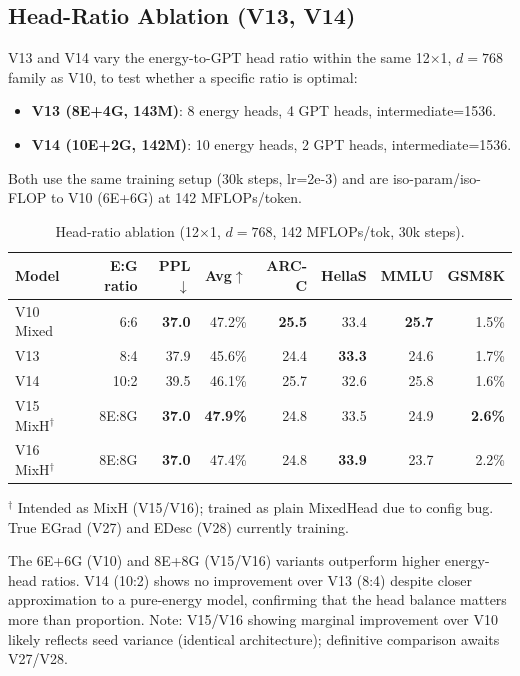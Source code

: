 \documentclass[11pt,a4paper]{article}
\begin{document}
\subsection{Head-Ratio Ablation (V13, V14)}

V13 and V14 vary the energy-to-GPT head ratio within the same 12$\times$1,
$d{=}768$ family as V10, to test whether a specific ratio is optimal:

\begin{itemize}
  \item \textbf{V13 (8E+4G, 143M)}: 8 energy heads, 4 GPT heads, intermediate=1536.
  \item \textbf{V14 (10E+2G, 142M)}: 10 energy heads, 2 GPT heads, intermediate=1536.
\end{itemize}

Both use the same training setup (30k steps, lr=2e-3) and are iso-param/iso-FLOP
to V10 (6E+6G) at 142 MFLOPs/token.

\begin{table}[h]
\centering
\caption{Head-ratio ablation (12$\times$1, $d{=}768$, 142 MFLOPs/tok, 30k steps).}
\label{tab:head_ratio}
\begin{tabular}{lrrrrrrr}
\toprule
\textbf{Model} & \textbf{E:G ratio} & \textbf{PPL}$\downarrow$ & \textbf{Avg}$\uparrow$
  & \textbf{ARC-C} & \textbf{HellaS} & \textbf{MMLU} & \textbf{GSM8K} \\
\midrule
V10 Mixed & 6:6 & \textbf{37.0} & 47.2\% & \textbf{25.5} & 33.4 & \textbf{25.7} & 1.5\% \\
V13       & 8:4 & 37.9 & 45.6\% & 24.4 & \textbf{33.3} & 24.6 & 1.7\% \\
V14       & 10:2 & 39.5 & 46.1\% & 25.7 & 32.6 & 25.8 & 1.6\% \\
\midrule
V15 MixH$^\dagger$ & 8E:8G & \textbf{37.0} & \textbf{47.9\%} & 24.8 & 33.5 & 24.9 & \textbf{2.6\%} \\
V16 MixH$^\dagger$ & 8E:8G & \textbf{37.0} & 47.4\% & 24.8 & \textbf{33.9} & 23.7 & 2.2\% \\
\bottomrule
\end{tabular}
{\footnotesize $^\dagger$ Intended as MixH (V15/V16); trained as plain MixedHead due to config bug. True EGrad (V27) and EDesc (V28) currently training.}
\end{table}

The 6E+6G (V10) and 8E+8G (V15/V16) variants outperform higher energy-head ratios.
V14 (10:2) shows no improvement over V13 (8:4) despite closer approximation to a
pure-energy model, confirming that the head balance matters more than proportion.
Note: V15/V16 showing marginal improvement over V10 likely reflects seed variance
(identical architecture); definitive comparison awaits V27/V28.
\end{document}
